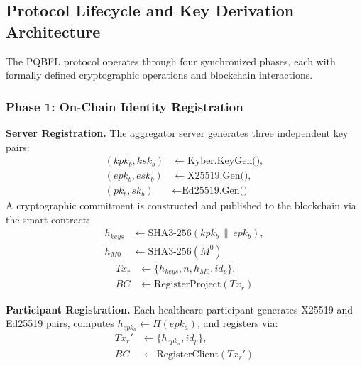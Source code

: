 \documentclass[journal, 10pt, twocolumn]{IEEEtran}
\begin{document}
\subsection{Protocol Lifecycle and Key Derivation Architecture}

The PQBFL protocol operates through four synchronized phases, each with formally defined cryptographic operations and blockchain interactions.

\subsubsection{Phase 1: On-Chain Identity Registration}



\textbf{Server Registration.} The aggregator server generates three independent key pairs:
\begin{equation}
\begin{split}
(kpk_b, ksk_b) &\leftarrow \text{Kyber.KeyGen()}, \\
(epk_b, esk_b) &\leftarrow \text{X25519.Gen()}, \\
(pk_b, sk_b) &\leftarrow \text{Ed25519.Gen()}
\end{split}
\label{eq:server_keygen}
\end{equation}
A cryptographic commitment is constructed and published to the blockchain via the smart contract:
\begin{equation}    
\begin{split}
h_{keys} &\leftarrow \text{SHA3-256}(kpk_b \,\|\, epk_b), \\
h_{M0} &\leftarrow \text{SHA3-256}(M^0)
\end{split}
\label{eq:server_hash}
\end{equation}
\begin{equation}
\begin{split}
Tx_r &\leftarrow \{h_{keys}, n, h_{M0}, id_p\}, \\
BC &\leftarrow \text{RegisterProject}(Tx_r)
\end{split}
\label{eq:server_register}
\end{equation}

\textbf{Participant Registration.} Each healthcare participant generates X25519 and Ed25519 pairs, computes $h_{epk_a} \leftarrow H(epk_a)$, and registers via:
\begin{equation}
\begin{split}
Tx_r' &\leftarrow \{h_{epk_a}, id_p\}, \\
BC &\leftarrow \text{RegisterClient}(Tx_r')
\end{split}
\label{eq:client_register}
\end{equation}
\end{document}
